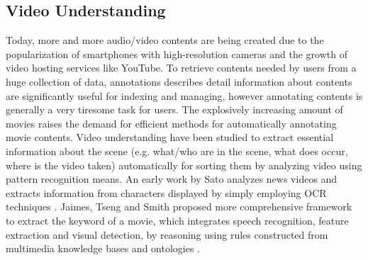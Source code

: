 \subsection{Video Understanding}
Today, more and more audio/video contents are being created due to the popularization of smartphones with high-resolution cameras and the growth of video hosting services like YouTube.
To retrieve contents needed by users from a huge collection of data, annotations describes detail information about contents are significantly useful for indexing and managing, however annotating contents is generally a very tiresome task for users.
The explosively increasing amount of movies raises the demand for efficient methods for automatically annotating movie contents.
Video understanding have been studied to extract essential information about the scene (e.g. what/who are in the scene, what does occur, where is the video taken) automatically for sorting them by analyzing video using pattern recognition means.
An early work by Sato analyzes news videos and extracts information from characters displayed by simply employing OCR techniques \cite{sato1998video}.
Jaimes, Tseng and Smith proposed more comprehensive framework to extract the keyword of a movie, which integrates speech recognition, feature extraction and visual detection, by reasoning using rules constructed from multimedia knowledge bases and ontologies \cite{jaimes2003modal}.

